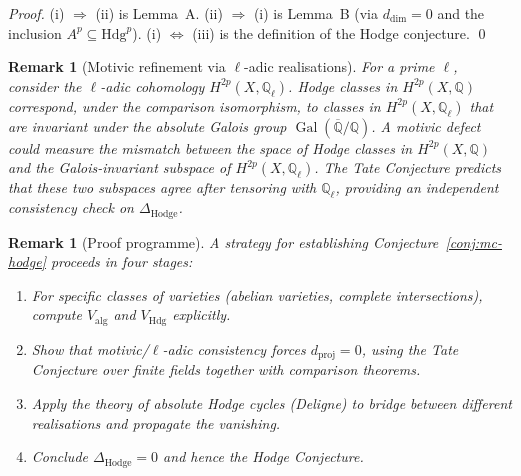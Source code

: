 \documentclass[11pt]{article}
\newtheorem{remark}[theorem]{Remark}
\theoremstyle{definition}
\DeclareMathOperator{\Gal}{Gal}
\begin{document}
\begin{proof}
(i) $\Rightarrow$ (ii) is Lemma~A. (ii) $\Rightarrow$ (i) is Lemma~B (via $d_{\mathrm{dim}} = 0$ and the inclusion $A^p \subseteq \mathrm{Hdg}^p$). (i) $\Leftrightarrow$ (iii) is the definition of the Hodge conjecture. \qed
\end{proof}

\begin{remark}[Motivic refinement via $\ell$-adic realisations]
\label{rem:motivic-refinement}
For a prime $\ell$, consider the $\ell$-adic cohomology
$H^{2p}(X,\mathbb{Q}_{\ell})$.  Hodge classes in
$H^{2p}(X,\mathbb{Q})$ correspond, under the comparison isomorphism,
to classes in $H^{2p}(X,\mathbb{Q}_{\ell})$ that are invariant under
the absolute Galois group $\Gal(\overline{\mathbb{Q}}/\mathbb{Q})$.
A \emph{motivic defect} could measure the mismatch between the space
of Hodge classes in $H^{2p}(X,\mathbb{Q})$ and the
Galois-invariant subspace of $H^{2p}(X,\mathbb{Q}_{\ell})$.  The
Tate Conjecture predicts that these two subspaces agree after tensoring
with $\mathbb{Q}_{\ell}$, providing an independent consistency check
on $\Delta_{\mathrm{Hodge}}$.
\end{remark}

\begin{remark}[Proof programme]
\label{rem:proof-programme}
A strategy for establishing Conjecture~\ref{conj:mc-hodge} proceeds in
four stages:
\begin{enumerate}[label=\textup{(\roman*)}]
  \item For specific classes of varieties (abelian varieties, complete
        intersections), compute $V_{\mathrm{alg}}$ and
        $V_{\mathrm{Hdg}}$ explicitly.
  \item Show that motivic/$\ell$-adic consistency forces
        $d_{\mathrm{proj}}=0$, using the Tate Conjecture over finite
        fields together with comparison theorems.
  \item Apply the theory of absolute Hodge cycles (Deligne) to bridge
        between different realisations and propagate the vanishing.
  \item Conclude $\Delta_{\mathrm{Hodge}}=0$ and hence the Hodge
        Conjecture.
\end{enumerate}
\end{remark}
\end{document}
